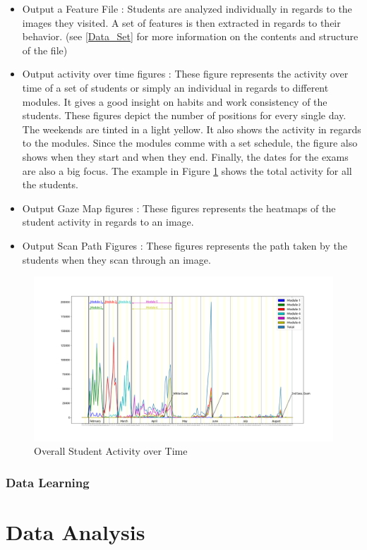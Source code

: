 \documentclass[a4paper,11pt]{report}
\numberwithin{figure}{section} %
\begin{document}
    \begin{itemize}
        \item[\textbullet] Output a Feature File : Students are analyzed individually in regards to the images they visited. A set of features is then extracted in regards to their behavior.
        (see \ref{Data_Set} for more information on the contents and structure of the file)
        \item[\textbullet] Output activity over time figures : These figure represents the activity over time of a set of students or simply an individual in regards to different modules. It gives a good insight on habits and work consistency of the students. These figures depict the number of positions for every single day. The weekends are tinted in a light yellow. It also shows the activity in regards to the modules. Since the modules comme with a set schedule, the figure also shows when they start and when they end. Finally, the dates for the exams are also a big focus. The example in Figure \ref{fig:timelapse} shows the total activity for all the students.
        \item[\textbullet] Output Gaze Map figures : These figures represents the heatmaps of the student activity in regards to an image.
        \item[\textbullet] Output Scan Path Figures : These figures represents the path taken by the students when they scan through an image.
    \end{itemize}
    \begin{figure}[H]
      \centering
      \includegraphics[width=.45\linewidth]{timelapse.png}
      \caption{Overall Student Activity over Time}
      \label{fig:timelapse}
    \end{figure}


    \subsubsection{Data Learning}


\section{Data Analysis}
\end{document}
